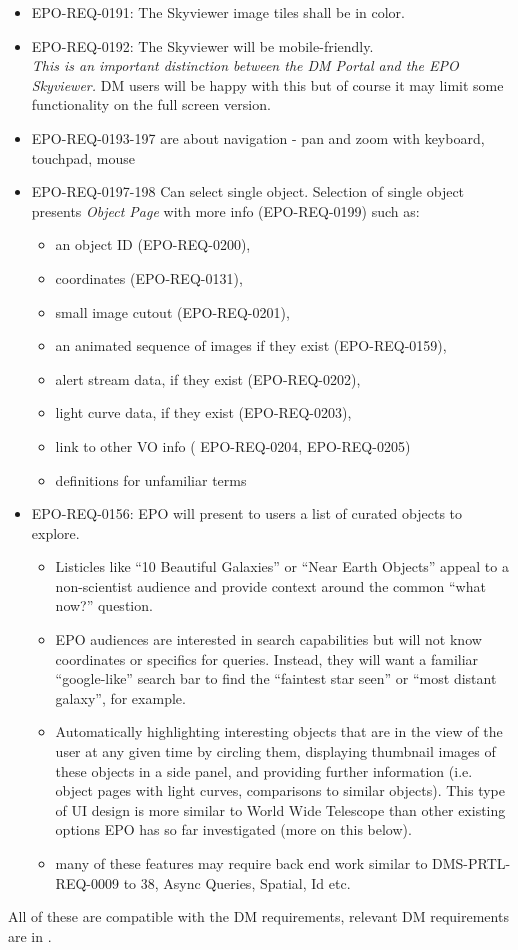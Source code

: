 \begin{itemize}
\item EPO-REQ-0191: The Skyviewer image tiles shall be in color.

\item EPO-REQ-0192: The Skyviewer will be mobile-friendly.\\
    {\em This is an important distinction between the DM Portal and the EPO Skyviewer.}  DM users will be happy with this but of course it may limit some functionality on the full screen version.

\item EPO-REQ-0193-197 are about navigation - pan and zoom with keyboard, touchpad, mouse

\item EPO-REQ-0197-198
Can select single object. Selection of single object presents {\em Object Page} with more info (EPO-REQ-0199) such as:
\begin{itemize}
\item  an object ID (EPO-REQ-0200),
\item  coordinates (EPO-REQ-0131),
\item  small image cutout (EPO-REQ-0201),
\item  an animated sequence of images if they exist (EPO-REQ-0159),
\item  alert stream data, if they exist (EPO-REQ-0202),
\item  light curve data, if they exist (EPO-REQ-0203),
\item  link to other VO info ( EPO-REQ-0204, EPO-REQ-0205)
\item  definitions for unfamiliar terms
\end{itemize}

\item EPO-REQ-0156: EPO will present to users a list of curated objects to explore.

\begin{itemize}
\item  Listicles like “10 Beautiful Galaxies” or “Near Earth Objects” appeal to a non-scientist audience and provide context around the common “what now?” question.
\item  EPO audiences are interested in search capabilities but will not know coordinates or specifics for queries.  Instead, they will want a familiar “google-like” search bar to find the “faintest star seen” or “most distant galaxy”, for example.
\item  Automatically highlighting interesting objects that are in the view of the user at any given time by circling them, displaying thumbnail images of these objects in a side panel, and providing further information (i.e. object pages with light curves, comparisons to similar objects). This type of UI design is more similar to World Wide Telescope than other existing options EPO has so far investigated (more on this below).
\item  many of these features may require back end work similar to DMS-PRTL-REQ-0009 to 38, Async Queries, Spatial, Id etc.
\end{itemize}

\end{itemize}
All of these are compatible with the DM requirements, relevant DM requirements are in .
